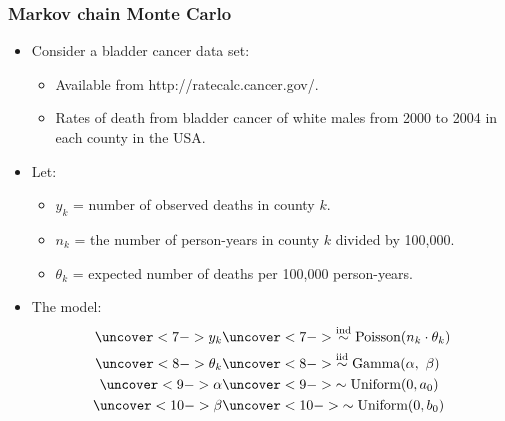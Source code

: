 \documentclass[handout]{beamer}
\numberwithin{equation}{section}
\begin{document}
\begin{frame}
\frametitle{Markov chain Monte Carlo}
\begin{itemize}
\item Consider a bladder cancer data set:
\begin{itemize}  \scriptsize
\pause \item Available from http://ratecalc.cancer.gov/.
\pause \item Rates of death from bladder cancer of white males from 2000 to 2004 in each county in the USA.
\end{itemize}
\pause \item Let:
\begin{itemize}  \scriptsize
\item $y_k$ = number of observed deaths in county $k$.
\pause \item $n_k$ = the number of person-years in county $k$ divided by 100,000.
\pause \item $\theta_k$ = expected number of deaths per 100,000 person-years.
\end{itemize} 
\pause \item The model:
\begin{align*}
\uncover<7->{y_k} &\uncover<7->{\stackrel{\text{ind}}{\sim} \text{Poisson}(n_k \cdot \theta_k)}\\
\uncover<8->{\theta_k} &\uncover<8->{\stackrel{\text{iid}}{\sim} \text{Gamma}(\alpha, \ \beta)}\\
\uncover<9->{\alpha} & \uncover<9->{\sim \text{Uniform}(0, a_0)} \\
\uncover<10->{\beta} & \uncover<10->{\sim \text{Uniform}(0, b_0)}
\end{align*}
\end{itemize}
\end{frame}
\end{document}
